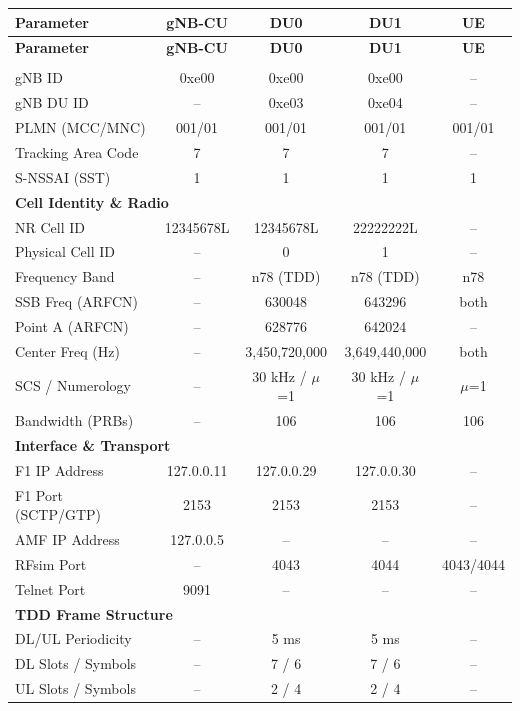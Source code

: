 \begin{longtable}{|p{4cm}|c|c|c|c|}
\hline
\textbf{Parameter} & \textbf{gNB-CU} & \textbf{DU0} & \textbf{DU1} & \textbf{UE} \\ \hline
\endfirsthead
\hline
\textbf{Parameter} & \textbf{gNB-CU} & \textbf{DU0} & \textbf{DU1} & \textbf{UE} \\ \hline
\endhead
\hline
\endfoot

\multicolumn{5}{|l|}{\textbf{Network Identity}} \\ \hline
gNB ID & 0xe00 & 0xe00 & 0xe00 & -- \\ \hline
gNB DU ID & -- & 0xe03 & 0xe04 & -- \\ \hline
PLMN (MCC/MNC) & 001/01 & 001/01 & 001/01 & 001/01 \\ \hline
Tracking Area Code & 7 & 7 & 7 & -- \\ \hline
S-NSSAI (SST) & 1 & 1 & 1 & 1 \\ \hline

\multicolumn{5}{|l|}{\textbf{Cell Identity \& Radio}} \\ \hline
NR Cell ID & 12345678L & 12345678L & 22222222L & -- \\ \hline
Physical Cell ID & -- & 0 & 1 & -- \\ \hline
Frequency Band & -- & n78 (TDD) & n78 (TDD) & n78 \\ \hline
SSB Freq (ARFCN) & -- & 630048 & 643296 & both \\ \hline
Point A (ARFCN) & -- & 628776 & 642024 & -- \\ \hline
Center Freq (Hz) & -- & 3,450,720,000 & 3,649,440,000 & both \\ \hline
SCS / Numerology & -- & 30 kHz / $\mu$=1 & 30 kHz / $\mu$=1 & $\mu$=1 \\ \hline
Bandwidth (PRBs) & -- & 106 & 106 & 106 \\ \hline

\multicolumn{5}{|l|}{\textbf{Interface \& Transport}} \\ \hline
F1 IP Address & 127.0.0.11 & 127.0.0.29 & 127.0.0.30 & -- \\ \hline
F1 Port (SCTP/GTP) & 2153 & 2153 & 2153 & -- \\ \hline
AMF IP Address & 127.0.0.5 & -- & -- & -- \\ \hline
RFsim Port & -- & 4043 & 4044 & 4043/4044 \\ \hline
Telnet Port & 9091 & -- & -- & -- \\ \hline

\multicolumn{5}{|l|}{\textbf{TDD Frame Structure}} \\ \hline
DL/UL Periodicity & -- & 5 ms & 5 ms & -- \\ \hline
DL Slots / Symbols & -- & 7 / 6 & 7 / 6 & -- \\ \hline
UL Slots / Symbols & -- & 2 / 4 & 2 / 4 & -- \\ \hline


\end{longtable}
